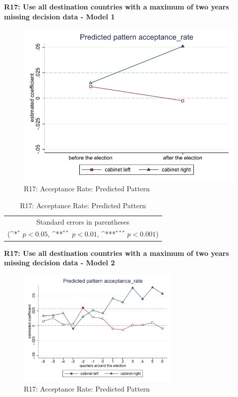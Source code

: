 \documentclass[10pt,a4paper]{scrartcl}
\begin{document}
\clearpage
\textbf{R17: Use all destination countries with a maximum of two years missing decision data - Model 1}
\begin{figure}[!ht]
	\centering
	\includegraphics[width=1\textwidth]{figures_edited/acceptance_rate_graph1_R17.pdf}
	\caption{R17: Acceptance Rate: Predicted Pattern}
\end{figure}

\begin{table}[!ht]\centering
	\renewcommand{\arraystretch}{1.25}
	\def\sym#1{\ifmmode^{#1}\else\(^{#1}\)\fi}
	\caption{R17: Acceptance Rate: Predicted Pattern}
	\begin{tabular}{l*{2}{c}}
		\hline\hline
		
		\hline\hline
		\multicolumn{3}{c}{\footnotesize Standard errors in parentheses} \\
		\multicolumn{3}{c}{\footnotesize (\sym{*} \(p<0.05\), \sym{**} \(p<0.01\), \sym{***} \(p<0.001\))}\\
	\end{tabular}
\end{table}

\clearpage
\textbf{R17: Use all destination countries with a maximum of two years missing decision data - Model 2}
\begin{figure}[!ht]
	\centering
	\includegraphics[width=0.7\textwidth]{figures_edited/acceptance_rate_graph2_R17.pdf}
	\caption{R17: Acceptance Rate: Predicted Pattern}
\end{figure}
\end{document}

